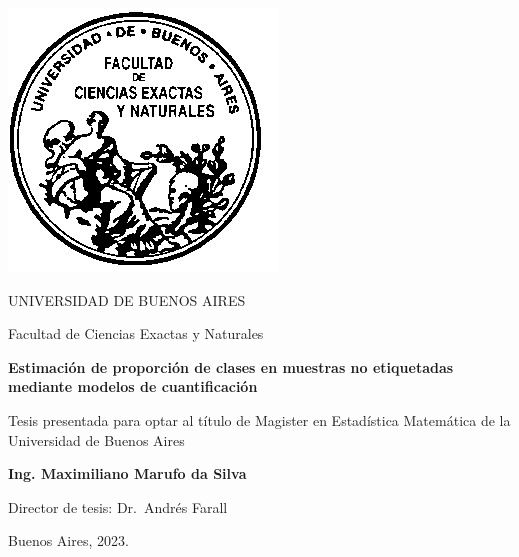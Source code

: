 \thispagestyle{empty}

\begin{center}
  \includegraphics[scale = 0.3]{logofac.jpg}
  
  \medskip
  UNIVERSIDAD DE BUENOS AIRES
  
  Facultad de Ciencias Exactas y Naturales
  
 
  
  \vspace{3cm}
  \textbf{\large Estimación de proporción de clases en muestras no etiquetadas \\ 
  mediante modelos de cuantificación}
  
  \vspace{2cm}
  Tesis presentada para optar al título de Magister en Estadística Matemática de
  la Universidad de Buenos Aires
  
  \vspace{2cm}
  \textbf{Ing. Maximiliano Marufo da Silva}
\end{center}


\vspace{1.5cm}
\noindent Director de tesis: Dr.~Andrés Farall
 

\vspace{1cm}
\noindent Buenos Aires,  2023.
